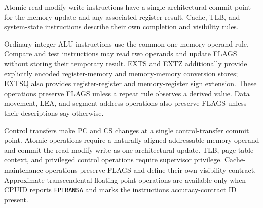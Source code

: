 Atomic read-modify-write instructions have a single architectural commit point for the memory update and any associated
register result. Cache, TLB, and system-state instructions describe their own completion and visibility rules.

Ordinary integer ALU instructions use the common one-memory-operand rule. Compare and test instructions may read two operands and
update FLAGS without storing their temporary result. EXTS and EXTZ additionally provide explicitly encoded
register-memory and memory-memory conversion stores; EXTSQ also provides register-register and memory-register sign
extension. These operations preserve FLAGS unless a repeat rule observes a derived value. Data movement, LEA, and
segment-address operations also preserve FLAGS unless their descriptions say otherwise.

Control transfers make PC and CS changes at a single control-transfer commit point. Atomic operations require a
naturally aligned addressable memory operand and commit the read-modify-write as one architectural update. TLB,
page-table context, and privileged control operations require supervisor privilege. Cache-maintenance operations
preserve FLAGS and define their own visibility contract. Approximate transcendental floating-point operations are
available only when CPUID reports \texttt{FPTRANSA} and marks the instruction\textquotesingle{}s accuracy-contract ID present.
